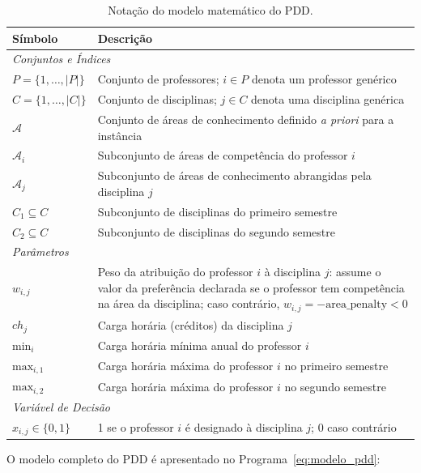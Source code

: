 \begin{table}[H]
\centering
\caption{Notação do modelo matemático do PDD.}
\label{tab:notacao}
\begin{tabular}{p{4cm}p{10cm}}
\hline
\textbf{Símbolo} & \textbf{Descrição} \\
\hline
\multicolumn{2}{l}{\textit{Conjuntos e Índices}} \\
\hline
$P = \{1,\ldots,|P|\}$ & Conjunto de professores; $i \in P$ denota um professor genérico \\
$C = \{1,\ldots,|C|\}$ & Conjunto de disciplinas; $j \in C$ denota uma disciplina genérica \\
$\mathcal{A}$            & Conjunto de áreas de conhecimento definido \textit{a priori} para a instância \\
$\mathcal{A}_i$          & Subconjunto de áreas de competência do professor $i$ \\
$\mathcal{A}_j$          & Subconjunto de áreas de conhecimento abrangidas pela disciplina $j$ \\
$C_1 \subseteq C$       & Subconjunto de disciplinas do primeiro semestre \\
$C_2 \subseteq C$       & Subconjunto de disciplinas do segundo semestre \\
\hline
\multicolumn{2}{l}{\textit{Parâmetros}} \\
\hline
$w_{i,j}$               & Peso da atribuição do professor $i$ à disciplina $j$: assume o valor da preferência declarada se o professor tem competência na área da disciplina; caso contrário, $w_{i,j} = -\text{area\_penalty} < 0$ \\
$ch_j$                  & Carga horária (créditos) da disciplina $j$ \\
$\text{min}_i$          & Carga horária mínima anual do professor $i$ \\
$\text{max}_{i,1}$      & Carga horária máxima do professor $i$ no primeiro semestre \\
$\text{max}_{i,2}$      & Carga horária máxima do professor $i$ no segundo semestre \\
\hline
\multicolumn{2}{l}{\textit{Variável de Decisão}} \\
\hline
$x_{i,j} \in \{0,1\}$  & 1 se o professor $i$ é designado à disciplina $j$; 0 caso contrário \\
\hline
\end{tabular}
\end{table}

O modelo completo do PDD é apresentado no Programa~\eqref{eq:modelo_pdd}:

